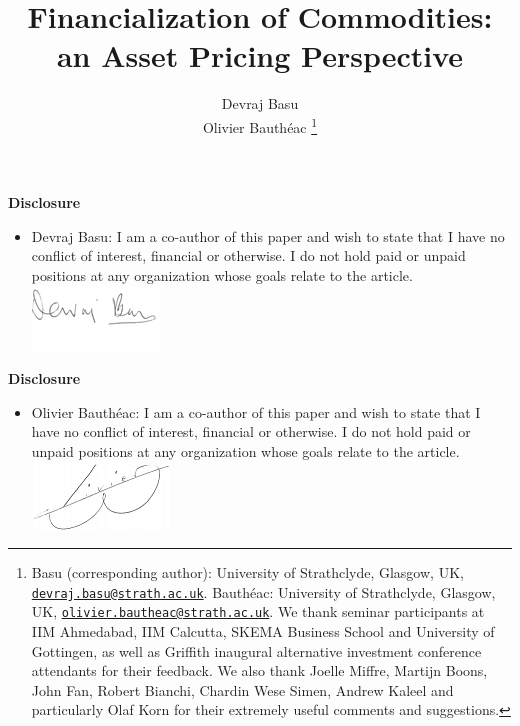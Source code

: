\documentclass[12pt,]{article}
\title{Financialization of Commodities: an Asset Pricing Perspective}
\author{ Devraj Basu  \\  Olivier Bauthéac  
	  \thanks{ Basu (corresponding author): University of Strathclyde, Glasgow, UK, \href{mailto:devraj.basu@strath.ac.uk}{\nolinkurl{devraj.basu@strath.ac.uk}}.  Bauthéac: University of Strathclyde, Glasgow, UK, \href{mailto:olivier.bautheac@strath.ac.uk}{\nolinkurl{olivier.bautheac@strath.ac.uk}}. 	  
	   \newline We thank seminar participants at IIM Ahmedabad, IIM Calcutta, SKEMA
Business School and University of Gottingen, as well as Griffith
inaugural alternative investment conference attendants for their
feedback. We also thank Joelle Miffre, Martijn Boons, John Fan, Robert
Bianchi, Chardin Wese Simen, Andrew Kaleel and particularly Olaf Korn
for their extremely useful comments and suggestions.  }
  }
\date{}
\providecommand{\tightlist}{%
  \setlength{\itemsep}{0pt}\setlength{\parskip}{0pt}}
\begin{document}
\maketitle


\newpage

\textbf{Disclosure}

\begin{itemize}
\tightlist
\item
  Devraj Basu: I am a co-author of this paper and wish to state that I
  have no conflict of interest, financial or otherwise. I do not hold
  paid or unpaid positions at any organization whose goals relate to the
  article.\\
  \includegraphics{pics/signature - Devraj.png}\\
\end{itemize}

\newpage

\textbf{Disclosure}

\begin{itemize}
\tightlist
\item
  Olivier Bauthéac: I am a co-author of this paper and wish to state
  that I have no conflict of interest, financial or otherwise. I do not
  hold paid or unpaid positions at any organization whose goals relate
  to the article.\\
  \includegraphics{pics/signature - Olivier.png}\\
\end{itemize}

\newpage


\end{document}
